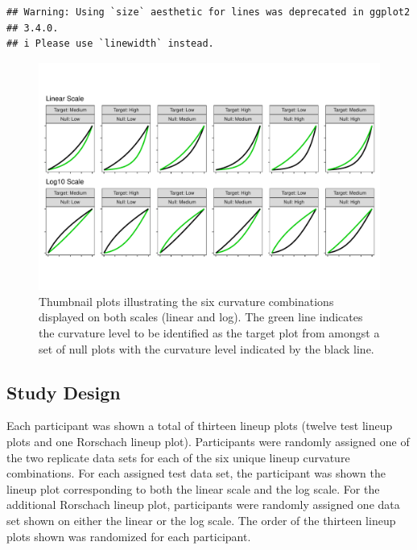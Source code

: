 \documentclass[12pt]{article}
\begin{document}
\begin{verbatim}
## Warning: Using `size` aesthetic for lines was deprecated in ggplot2
## 3.4.0.
## i Please use `linewidth` instead.
\end{verbatim}

\begin{figure}[tbp]

{\centering \includegraphics[width=1\linewidth,]{logarithmic-lineups_files/figure-latex/curvature-combination-example-1} 

}

\caption[Lineup curvature combinations]{Thumbnail plots illustrating the six curvature combinations displayed on both scales (linear and log). The green line indicates the curvature level to be identified as the target plot from amongst a set of null plots with the curvature level indicated by the black line.}\label{fig:curvature-combination-example}
\end{figure}

\hypertarget{study-design}{%
\subsection{Study Design}\label{study-design}}

Each participant was shown a total of thirteen lineup plots (twelve test
lineup plots and one Rorschach lineup plot). Participants were randomly
assigned one of the two replicate data sets for each of the six unique
lineup curvature combinations. For each assigned test data set, the
participant was shown the lineup plot corresponding to both the linear
scale and the log scale. For the additional Rorschach lineup plot,
participants were randomly assigned one data set shown on either the
linear or the log scale. The order of the thirteen lineup plots shown
was randomized for each participant.
\end{document}
